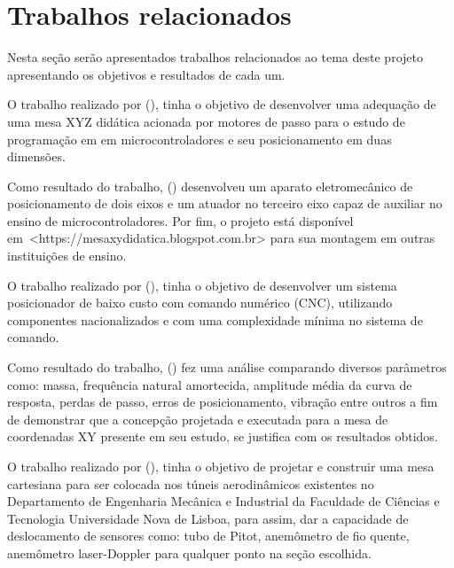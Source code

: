 \section{Trabalhos relacionados}\label{sec:trabalhos}

Nesta seção serão apresentados trabalhos relacionados ao tema deste projeto apresentando os objetivos e resultados 
de cada um.

O trabalho realizado por \citeauthor{butignol2017adequaccao} (\citeyear{butignol2017adequaccao}), tinha o objetivo de desenvolver uma adequação de uma mesa XYZ didática 
acionada por motores de passo para o estudo de programação em em microcontroladores e seu posicionamento em duas 
dimensões.

Como resultado do trabalho, \citeauthor{butignol2017adequaccao} (\citeyear{butignol2017adequaccao}) 
desenvolveu um aparato eletromecânico de posicionamento de dois eixos e um atuador no terceiro eixo 
capaz de auxiliar no ensino de microcontroladores. Por fim, o projeto está disponível 
em~<https://mesaxydidatica.blogspot.com.br> para sua montagem em outras instituições de ensino.

O trabalho realizado por \citeauthor{camargo1988mesa} (\citeyear{camargo1988mesa}), tinha o objetivo de desenvolver um sistema posicionador de baixo custo 
com comando numérico (CNC), utilizando componentes nacionalizados e com uma complexidade mínima no sistema de comando.

Como resultado do trabalho, \citeauthor{camargo1988mesa} (\citeyear{camargo1988mesa}) fez uma análise comparando diversos parâmetros como: massa, frequência 
natural amortecida, amplitude média da curva de resposta, perdas de passo, erros de posicionamento, vibração entre 
outros a fim de demonstrar que a concepção projetada e executada para a mesa de coordenadas XY presente em seu estudo, 
se justifica com os resultados obtidos.

O trabalho realizado por \citeauthor{ramos2018desenvolvimento} (\citeyear{ramos2018desenvolvimento}), tinha o objetivo de projetar e construir uma mesa cartesiana para ser colocada 
nos túneis aerodinâmicos existentes no Departamento de Engenharia Mecânica e Industrial da Faculdade de Ciências e 
Tecnologia Universidade Nova de Lisboa, para assim, dar a capacidade de deslocamento de sensores como: tubo de Pitot, 
anemômetro de fio quente, anemômetro laser-Doppler para qualquer ponto na seção escolhida.

